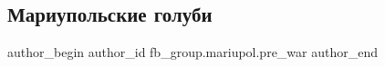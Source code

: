  
 
 
 
 

\subsection{Мариупольские голуби}
\label{sec:12_02_2023.fb.fb_group.mariupol.pre_war.3.mariupolskie_golubi}

\ifcmt
 author_begin
   author_id fb_group.mariupol.pre_war
 author_end
\fi

